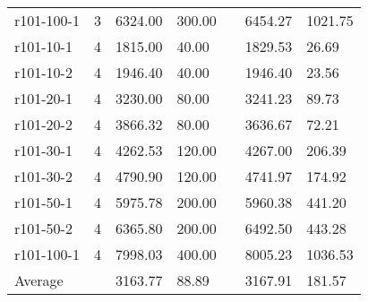 \documentclass[final,5p,times,twocolumn]{elsarticle}
\begin{document}
{{{{{\begin{table}[htbp]
\begin{tabular}{l l l l l l l}
r101-100-1&3&6324.00&300.00&&6454.27&1021.75\\
r101-10-1&4&1815.00&40.00&&1829.53&26.69\\
r101-10-2&4&1946.40&40.00&&1946.40&23.56\\
r101-20-1&4&3230.00&80.00&&3241.23&89.73\\
r101-20-2&4&3866.32&80.00&&3636.67&72.21\\
r101-30-1&4&4262.53&120.00&&4267.00&206.39\\
r101-30-2&4&4790.90&120.00&&4741.97&174.92\\
r101-50-1&4&5975.78&200.00&&5960.38&441.20\\
r101-50-2&4&6365.80&200.00&&6492.50&443.28\\
r101-100-1&4&7998.03&400.00&&8005.23&1036.53\\
\hline
Average&&3163.77&88.89&&3167.91&181.57\\
\hline
\end{tabular}
\label{tab:pt100_10}
\end{table}

}}}}}
\end{document}
